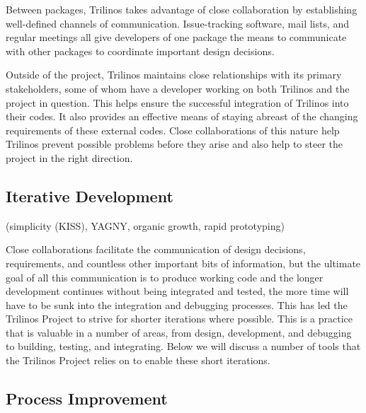 \documentclass[12pt,relax]{article}
\begin{document}
Between packages, Trilinos takes advantage of close collaboration by 
establishing well-defined channels of communication.  Issue-tracking
software, mail lists, and regular meetings all give developers of one package
the means to communicate with other packages to coordinate important design
decisions.

Outside of the project, Trilinos maintains close relationships with its primary
stakeholders, some of whom have a developer working on both Trilinos and the
project in question.  This helps ensure the successful integration of Trilinos
into their codes.  It also provides an effective means of staying abreast of
the changing requirements of these external codes.  Close collaborations of
this nature help Trilinos prevent possible problems before they arise and also
help to steer the project in the right direction.

\subsection{Iterative Development}

(simplicity (KISS), YAGNY, organic growth, rapid prototyping)

Close collaborations facilitate the communication of design decisions, 
requirements, and countless other important bits of information, but the
ultimate goal of all this communication is to produce working code and the
longer development continues without being integrated and tested, the more
time will have to be sunk into the integration and debugging processes.  This
has led the Trilinos Project to strive for shorter iterations where possible.
This is a practice that is valuable in a number of areas, from design,
development, and debugging to building, testing, and integrating.  Below we
will discuss a number of tools that the Trilinos Project relies on to enable
these short iterations.

\subsection{Process Improvement}
\end{document}
